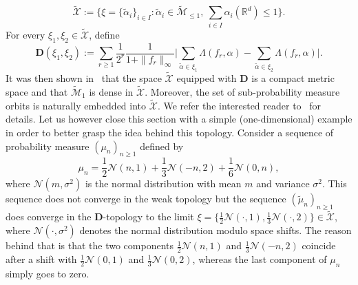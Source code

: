 \documentclass[a4paper,11pt]{amsart}
\numberwithin{equation}{section}
\newcommand{\bbR}{{\ensuremath{\mathbb R}} }
\newcommand{\cM}{{\ensuremath{\mathcal M}} }
\newcommand{\cN}{{\ensuremath{\mathcal N}} }
\newcommand{\cX}{{\ensuremath{\mathcal X}} }
\newcommand{\ga}{\alpha}
\newcommand{\gL}{\Lambda}
\newcommand{\gs}{\sigma}
\newcommand{\bfD}{\mathbf{D}}
\renewcommand{\tilde}{\widetilde}          %
\newcommand{\8}{\infty}
\newcommand{\beq}{\begin{equation}}
\newcommand{\eeq}{\end{equation}}
\begin{document}
\beq
\tilde\cX := \Big\{
\xi = \{\tilde \ga_i\}_{i\in I} \colon \tilde \ga_i \in \tilde \cM_{\le 1},\ \sum_{i\in I} \ga_i(\bbR^d) \le 1\Big\}.
\eeq
For every $\xi_1, \xi_2\in \tilde \cX$, define
\beq
\mathbf{D}(\xi_1, \xi_2) := \sum_{r\ge 1} \frac{1}{2^r} \frac{1}{1+\|f_r\|_{\infty}}
\Big|%
\sum_{\tilde\ga\in\xi_1} \gL(f_r, \ga)- \sum_{\tilde\ga\in\xi_2} \gL(f_r, \ga)
\Big|.%
\eeq
It was then shown in~\cite{MV2016} that the space $\tilde\cX$ equipped with $\mathbf{D}$ is a compact metric space and that $\tilde \cM_1$ is dense in $\tilde\cX$. Moreover, the set of sub-probability measure orbits is naturally embedded into $\tilde\cX$. We refer the interested reader to~\cite{MV2016} for details. Let us however close this section with a simple (one-dimensional) example in order to better grasp the idea behind this topology. Consider a sequence of probability measure $(\mu_n)_{n\ge 1}$ defined by
\beq
\mu_n = \frac12 \cN(n,1) + \frac13 \cN(-n,2) + \frac16 \cN(0,n),
\eeq
where $\cN(m,\gs^2)$ is the normal distribution with mean $m$ and variance $\gs^2$. This sequence does not converge in the weak topology but the sequence $(\tilde \mu_n)_{n\ge 1}$ does converge in the $\bfD$-topology to the limit $\xi=\{\frac12 \cN(\cdot, 1), \frac13 \cN(\cdot, 2)\}\in\tilde\cX$, where $\cN(\cdot, \gs^2)$ denotes the normal distribution modulo space shifts. The reason behind that is that the two components $\tfrac12 \cN(n,1)$ and $ \tfrac13 \cN(-n,2)$ coincide after a shift with $\tfrac12 \cN(0,1)$ and $ \tfrac13 \cN(0,2)$, whereas the last component of $\mu_n$ simply goes to zero.

%
\end{document}
